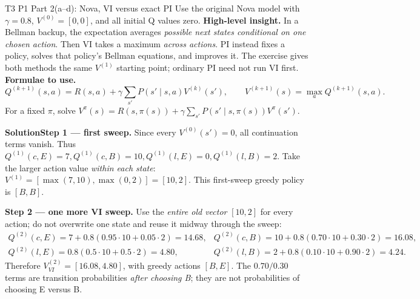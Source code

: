 \documentclass[10pt,a4paper]{article}
\newcommand{\ans}{\par\smallskip\textbf{\color{good}Solution\quad}}
\begin{document}
\begin{question}{T3 P1 Part 2(a--d): Nova, VI versus exact PI}\label{q:t3p1dp}
Use the original Nova model with $\gamma=0.8$, $V^{(0)}=[0,0]$, and all initial Q values zero.
\textbf{High-level insight.} In a Bellman backup, the expectation averages \emph{possible next states conditional on one chosen action}. Then VI takes a maximum \emph{across actions}. PI instead fixes a policy, solves that policy's Bellman equations, and improves it. The exercise gives both methods the same $V^{(1)}$ starting point; ordinary PI need not run VI first.
\textbf{Formulae to use.}
\[
Q^{(k+1)}(s,a)=R(s,a)+\gamma\sum_{s'}P(s'\mid s,a)V^{(k)}(s'),\qquad
V^{(k+1)}(s)=\max_a Q^{(k+1)}(s,a).
\]
For a fixed $\pi$, solve $V^\pi(s)=R(s,\pi(s))+\gamma\sum_{s'}P(s'\mid s,\pi(s))V^\pi(s')$.
\ans \textbf{Step 1 --- first sweep.} Since every $V^{(0)}(s')=0$, all continuation terms vanish. Thus $Q^{(1)}(c,E)=7,Q^{(1)}(c,B)=10,Q^{(1)}(l,E)=0,Q^{(1)}(l,B)=2$. Take the larger action value \emph{within each state}: $V^{(1)}=[\max(7,10),\max(0,2)]=[10,2]$. This first-sweep greedy policy is $[B,B]$.

\textbf{Step 2 --- one more VI sweep.} Use the \emph{entire old vector} $[10,2]$ for every action; do not overwrite one state and reuse it midway through the sweep:
\[
\begin{array}{ll}
Q^{(2)}(c,E)=7+0.8(0.95\cdot10+0.05\cdot2)=14.68,&
Q^{(2)}(c,B)=10+0.8(0.70\cdot10+0.30\cdot2)=16.08,\\
Q^{(2)}(l,E)=0.8(0.5\cdot10+0.5\cdot2)=4.80,&
Q^{(2)}(l,B)=2+0.8(0.10\cdot10+0.90\cdot2)=4.24.
\end{array}
\]
Therefore $\boxed{V^{(2)}_{VI}=[16.08,4.80]}$, with greedy actions $[B,E]$. The $0.70/0.30$ terms are transition probabilities \emph{after choosing B}; they are not probabilities of choosing E versus B.


\end{question}
\end{document}
